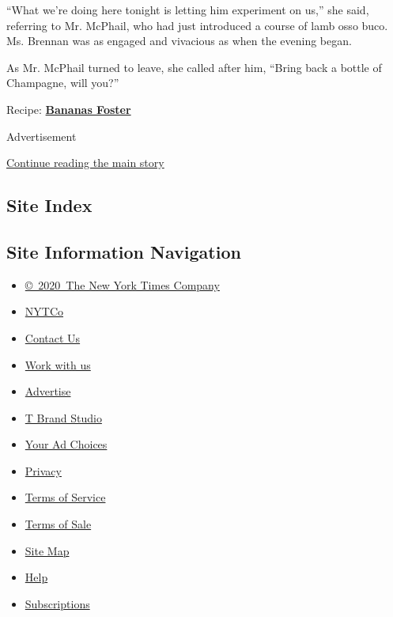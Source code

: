 ``What we're doing here tonight is letting him experiment on us,'' she
said, referring to Mr. McPhail, who had just introduced a course of lamb
osso buco. Ms. Brennan was as engaged and vivacious as when the evening
began.

As Mr. McPhail turned to leave, she called after him, ``Bring back a
bottle of Champagne, will you?''

Recipe:
\href{http://cooking.nytimes3xbfgragh.onion/recipes/1017148-bananas-foster}{\textbf{Bananas
Foster}}

Advertisement

\protect\hyperlink{after-bottom}{Continue reading the main story}

\hypertarget{site-index}{%
\subsection{Site Index}\label{site-index}}

\hypertarget{site-information-navigation}{%
\subsection{Site Information
Navigation}\label{site-information-navigation}}

\begin{itemize}
\tightlist
\item
  \href{https://help.nytimes3xbfgragh.onion/hc/en-us/articles/115014792127-Copyright-notice}{©~2020~The
  New York Times Company}
\end{itemize}

\begin{itemize}
\tightlist
\item
  \href{https://www.nytco.com/}{NYTCo}
\item
  \href{https://help.nytimes3xbfgragh.onion/hc/en-us/articles/115015385887-Contact-Us}{Contact
  Us}
\item
  \href{https://www.nytco.com/careers/}{Work with us}
\item
  \href{https://nytmediakit.com/}{Advertise}
\item
  \href{http://www.tbrandstudio.com/}{T Brand Studio}
\item
  \href{https://www.nytimes3xbfgragh.onion/privacy/cookie-policy\#how-do-i-manage-trackers}{Your
  Ad Choices}
\item
  \href{https://www.nytimes3xbfgragh.onion/privacy}{Privacy}
\item
  \href{https://help.nytimes3xbfgragh.onion/hc/en-us/articles/115014893428-Terms-of-service}{Terms
  of Service}
\item
  \href{https://help.nytimes3xbfgragh.onion/hc/en-us/articles/115014893968-Terms-of-sale}{Terms
  of Sale}
\item
  \href{https://spiderbites.nytimes3xbfgragh.onion}{Site Map}
\item
  \href{https://help.nytimes3xbfgragh.onion/hc/en-us}{Help}
\item
  \href{https://www.nytimes3xbfgragh.onion/subscription?campaignId=37WXW}{Subscriptions}
\end{itemize}
